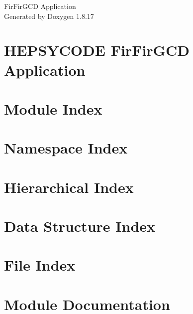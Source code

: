 \let\mypdfximage\pdfximage\def\pdfximage{\immediate\mypdfximage}\documentclass[twoside]{book}
\newcommand{\+}{\discretionary{\mbox{\scriptsize$\hookleftarrow$}}{}{}}
\newcommand{\clearemptydoublepage}{%
  \newpage{\pagestyle{empty}\cleardoublepage}%
}
\begin{document}
\hypersetup{pageanchor=false,
             bookmarksnumbered=true,
             pdfencoding=unicode
            }
\begin{titlepage}
\vspace*{7cm}
\begin{center}%
{\Large Fir\+Fir\+G\+CD Application }\\
\vspace*{1cm}
{\large Generated by Doxygen 1.8.17}\\
\end{center}
\end{titlepage}
\clearemptydoublepage
{}
\tableofcontents
\clearemptydoublepage
{}
\hypersetup{pageanchor=true}

\chapter{H\+E\+P\+S\+Y\+C\+O\+DE Fir\+Fir\+G\+CD Application}
\label{index}\hypertarget{index}{}
\chapter{Module Index}

\chapter{Namespace Index}

\chapter{Hierarchical Index}

\chapter{Data Structure Index}

\chapter{File Index}

\chapter{Module Documentation}












\end{document}
